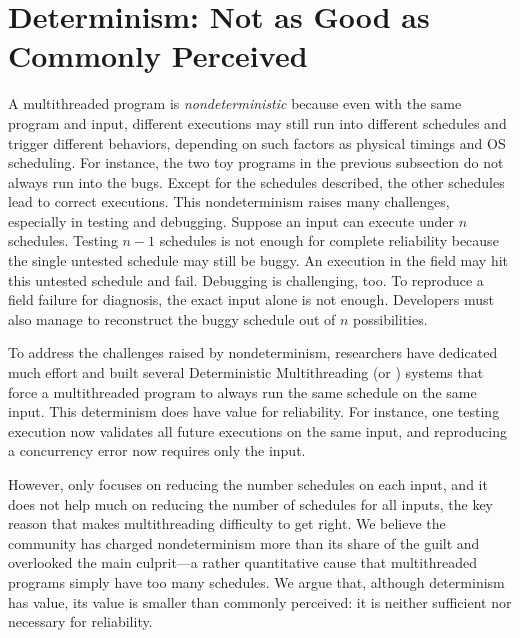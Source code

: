 


\section{Determinism: Not as Good as Commonly Perceived} \label{sec:smt-dmt}

A multithreaded program is \emph{nondeterministic} because even with the same
program and input, different executions may still run into different schedules
and trigger different behaviors, depending on such factors as physical timings
and OS scheduling. For instance, the two toy programs in the previous subsection
do not always run into the bugs.  Except for the schedules described, the
other schedules lead to correct executions. This nondeterminism raises many
challenges, especially in testing and debugging.  Suppose an input can execute
under $n$ schedules. Testing $n-1$ schedules is not enough for complete
reliability because the single untested schedule may still be buggy.  An
execution in the field may hit this untested schedule and fail.  Debugging is
challenging, too. To reproduce a field failure for diagnosis, the exact input
alone is not enough. Developers must also manage to reconstruct the buggy
schedule out of $n$ possibilities.

To address the challenges raised by nondeterminism, researchers have dedicated
much effort and built several Deterministic Multithreading (or \dmt) systems
that force a multithreaded program to always run the same schedule on the same
input.  This determinism does have value for reliability.  For instance, one
testing execution now validates all future executions on the same input, and 
reproducing a concurrency error now requires only the input.

However, \dmt only focuses on reducing the number schedules on each input, and
it does not help much on reducing the number of schedules for all inputs, the
key reason that makes multithreading difficulty to get right.  We believe the
community has charged nondeterminism more
than its share of the guilt and overlooked the main culprit---a rather
quantitative cause that multithreaded programs simply have too many schedules.
We argue that, although determinism has value, its value is smaller than
commonly perceived: it is neither sufficient nor necessary for reliability.

